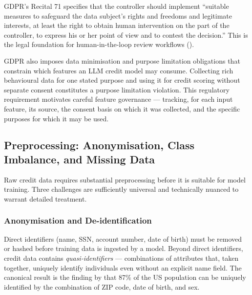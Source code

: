 \begin{context}
GDPR's Recital 71 specifies that the controller should implement ``suitable measures to safeguard the data subject's rights and freedoms and legitimate interests, at least the right to obtain human intervention on the part of the controller, to express his or her point of view and to contest the decision.'' This is the legal foundation for human-in-the-loop review workflows ().

GDPR also imposes data minimisation and purpose limitation obligations that constrain which features an LLM credit model may consume. Collecting rich behavioural data for one stated purpose and using it for credit scoring without separate consent constitutes a purpose limitation violation. This regulatory requirement motivates careful feature governance --- tracking, for each input feature, its source, the consent basis on which it was collected, and the specific purposes for which it may be used.

\subsection{Preprocessing: Anonymisation, Class Imbalance, and Missing Data}
\label{subsec:credit-preprocessing}

Raw credit data requires substantial preprocessing before it is suitable for model training. Three challenges are sufficiently universal and technically nuanced to warrant detailed treatment.

\subsubsection*{Anonymisation and De-identification}

Direct identifiers (name, SSN, account number, date of birth) must be removed or hashed before training data is ingested by a model. Beyond direct identifiers, credit data contains \emph{quasi-identifiers} --- combinations of attributes that, taken together, uniquely identify individuals even without an explicit name field. The canonical result is the finding by \citet{sweeney2002k} that 87\% of the US population can be uniquely identified by the combination of ZIP code, date of birth, and sex.


\end{context}
